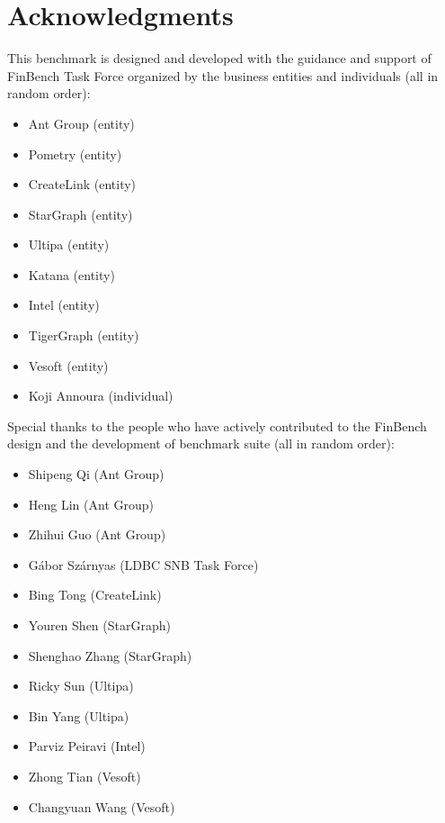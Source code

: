 \chapter*{Acknowledgments}
\label{sec:acknowledgments}

\renewcommand{\labelitemii}{\textbullet}

This benchmark is designed and developed with the guidance and support of
FinBench Task Force organized by the business entities and individuals (all in
random order):
\begin{itemize}
  \item Ant Group (entity)
  \item Pometry (entity)
  \item CreateLink (entity)
  \item StarGraph (entity)
  \item Ultipa (entity)
  \item Katana (entity)
  \item Intel (entity)
  \item TigerGraph (entity)
  \item Vesoft (entity)
  \item Koji Annoura (individual)
\end{itemize}

Special thanks to the people who have actively contributed to the FinBench
design and the development of benchmark suite (all in random order):

\begin{itemize}
  \item Shipeng Qi (Ant Group)
  \item Heng Lin (Ant Group)
  \item Zhihui Guo (Ant Group)
  \item Gábor Szárnyas (LDBC SNB Task Force)
  \item Bing Tong (CreateLink)
  \item Youren Shen (StarGraph)
  \item Shenghao Zhang (StarGraph)
  \item Ricky Sun (Ultipa)
  \item Bin Yang (Ultipa)
  \item Parviz Peiravi (Intel)
  \item Zhong Tian (Vesoft)
  \item Changyuan Wang (Vesoft)
\end{itemize}